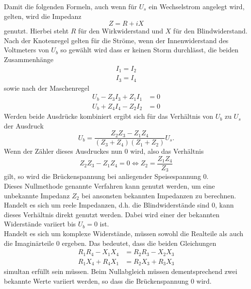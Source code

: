 Damit die folgenden Formeln, auch wenn für $U_s$ ein Wechselstrom angelegt wird, gelten, wird die Impedanz
\begin{equation}
  Z = R + i X
\end{equation}
genutzt.
Hierbei steht $R$ für den Wirkwiderstand und $X$ für den Blindwiderstand. \\
Nach der Knotenregel gelten für die Ströme, wenn der Innenwiderstand des Voltmeters von $U_b$ so gewählt wird dass er keinen Storm durchlässt, die beiden Zusammenhänge
\begin{gather}
  I_1 = I_2 \\
  I_3 = I_4
\end{gather}
sowie nach der Maschenregel
\begin{align}
  U_b - Z_3 I_3 + Z_1 I_1 &= 0 \\
  U_b + Z_4 I_4 - Z_2 I_2 &= 0
\end{align}
Werden beide Ausdrücke kombiniert ergibt sich für das Verhältnis von $U_b$ zu $U_s$ der Ausdruck
\begin{equation}
  U_b = \frac{Z_2 Z_3 - Z_1 Z_4}{(Z_3 + Z_4)(Z_1 + Z_2)}U_s.
\end{equation}
Wenn der Zähler dieses Ausdruckes nun 0 wird, also das Verhältnis
\begin{equation}
Z_2 Z_3 - Z_1 Z_4 = 0 \iff Z_2 = \frac{Z_1 Z_4}{Z_3}
\end{equation}
gilt, so wird die Brückenspannung bei anliegender Speisespannung 0.\\
Dieses Nullmethode genannte Verfahren kann genutzt werden, um eine unbekannte Impedanz $Z_2$ bei ansonsten bekannten Impedanzen zu berechnen.
Handelt es sich um reele Impedanzen, d.h. die Blindwiderstände sind 0, kann dieses Verhältnis direkt genutzt werden.
Dabei wird einer der bekannten Widerstände variiert bis $U_b=0$ ist.\\
Handelt es sich um komplexe Widerstände, müssen sowohl die Realteile als auch die Imaginärteile 0 ergeben.
Das bedeutet, dass die beiden Gleichungen
\begin{align}
  R_1 R_4 - X_1 X_4 &= R_2 R_3 - X_2 X_3 \\
  R_1 X_4 + R_4 X_1 &= R_2 X_3 + R_3 X_3
  \end{align}
simultan erfüllt sein müssen.
Beim Nullabgleich müssen dementsprechend zwei bekannte Werte variiert werden, so dass die Brückenspannung 0 wird.
